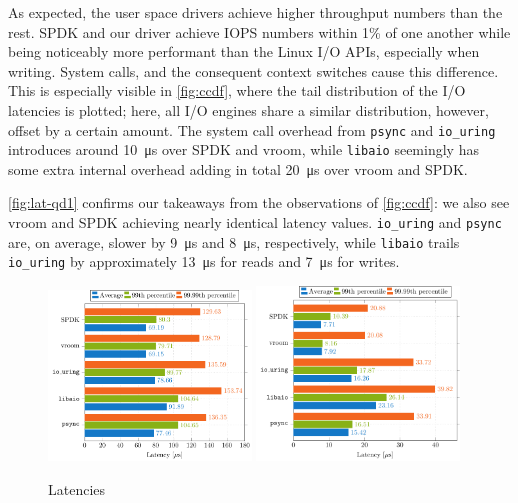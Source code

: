 As expected, the user space drivers achieve higher throughput numbers than the rest. SPDK and our driver achieve IOPS numbers within 1\% of one another while being noticeably more performant than the Linux I/O APIs, especially when writing. System calls, and the consequent context switches cause this difference. This is especially visible in \autoref{fig:ccdf}, where the tail distribution of the I/O latencies is plotted; here, all I/O engines share a similar distribution, however, offset by a certain amount. The system call overhead from \texttt{psync} and \texttt{io\_uring} introduces around \qty{10}{\micro\second} over SPDK and vroom, while \texttt{libaio} seemingly has some extra internal overhead adding in total \qty{20}{\micro\second} over vroom and SPDK.

\autoref{fig:lat-qd1} confirms our takeaways from the observations of \autoref{fig:ccdf}: we also see vroom and SPDK achieving nearly identical latency values. \texttt{io\_uring} and \texttt{psync} are, on average, slower by \qty{9}{\micro\second} and \qty{8}{\micro\second}, respectively, while \texttt{libaio} trails \texttt{io\_uring} by approximately \qty{13}{\micro\second} for reads and \qty{7}{\micro\second} for writes.

\begin{figure}[H]
  \centering
   {\includegraphics[width=0.48\textwidth]{figures/latency-read-xbar} \label{fig:lat-read}}
   {\includegraphics[width=0.48\textwidth]{figures/latency-write-xbar} \label{fig:lat-write}}
  \caption{Latencies}
  \label{fig:lat-qd1}
\end{figure}
